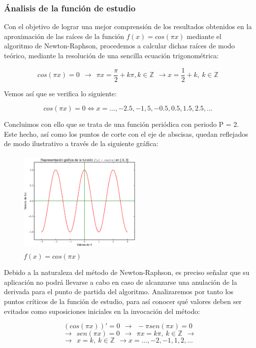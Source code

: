 \documentclass{beamer}
\begin{document}
\begin{frame}

\frametitle{Ánalisis de la función de estudio}
Con el objetivo de lograr una mejor comprensión de los resultados obtenidos en la aproximación de
las raíces de la función $f(x) = cos (\pi x)$ mediante el algoritmo de Newton-Raphson, procedemos 
a calcular dichas raíces de modo teórico, mediante la resolución de una sencilla ecuación trigonométrica:

$$cos (\pi x) = 0 \ \ \to \ \ \pi x = \frac{\pi}{2} + k \pi, k \in \mathbb{Z} \ \ \to x = \frac{1}{2} +
k, \ k \in \mathbb{Z}$$

Vemos así que se verifica lo siguiente:

$$cos (\pi x) = 0 \iff x = ..., -2.5, -1,5, -0.5, 0.5, 1.5, 2.5, ...$$


\end{frame}

\begin{frame}

Concluimos con ello que se trata de una función periódica con periodo P = 2. Este hecho, así como
los puntos de corte con el eje de abscisas, quedan reflejados de modo ilustrativo a través de la 
siguiente gráfica:

\begin{figure}[!th]
\begin{center}\includegraphics[height=5cm, width=6cm]{images/cos.eps}
\caption{$f(x) = cos (\pi x)$}
\label{cos}
\end{center}
\end{figure}

\end{frame}
\begin{frame}

Debido a la naturaleza del método de Newton-Raphson, es preciso señalar que su aplicación no podrá
llevarse a cabo en caso de alcanzarse una anulación de la derivada para el punto de partida del
algoritmo. Analizaremos por tanto los puntos críticos de la función de estudio, para así conocer 
qué valores deben ser evitados como suposiciones iniciales en la invocación del método:

$$(cos (\pi x))' = 0 \ \ \to \ \ -\pi sen (\pi x) = 0 $$
$$\ \ \to \ \ sen (\pi x) = 0 \ \ \to \ \ 
\pi x = k \pi, \ k \in \mathbb{Z} \ \ \to $$
$$\to \ \ x = k, \ k \in \mathbb{Z} \ \ \to x = ..., -2, -1, 1, 2, ...$$


\end{frame}
\end{document}
